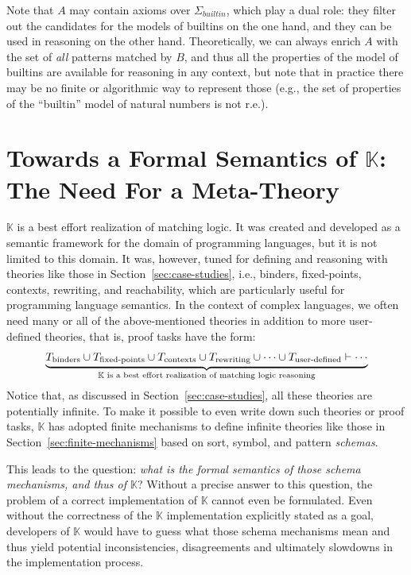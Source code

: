 \documentclass[UTF8,11pt]{article}
\theoremstyle{plain}
\theoremstyle{definition}
\theoremstyle{remark}
\newcommand{\K}{\mbox{$\mathbb{K}$}\xspace}
\newcommand{\builtin}{\textit{builtin}}
\begin{document}
Note that $A$ may contain axioms over $\Sigma_\builtin$, which play a dual
role: they filter out the candidates for the models of builtins on the one
hand, and they can be used in reasoning on the other hand.
Theoretically, we can always enrich $A$ with the set of \emph{all} patterns
matched by $B$, and thus all the properties of the model of builtins are
available for reasoning in any context, but note that in practice there may
be no finite or algorithmic way to represent those
(e.g., the set of properties of the ``builtin'' model of natural numbers is
not r.e.).

\section{Towards a Formal Semantics of {\K}: The Need For a Meta-Theory}
\label{sec:meta-theory-reflection}

{\K} is a best effort realization of matching logic.
It was created and developed as a semantic framework for the domain
of programming languages, but it is not limited to this domain.
It was, however, tuned for defining and reasoning with theories like
those in Section~\ref{sec:case-studies}, i.e.,
binders, fixed-points, contexts, rewriting, and reachability, which
are particularly useful for programming language semantics.
In the context of complex languages, we often need many or all of the
above-mentioned theories in addition to more user-defined theories, that is,
proof tasks have the form:
$$
\underbrace{T_\textrm{binders} \cup
T_\textrm{fixed-points} \cup 
T_\textrm{contexts} \cup 
T_\textrm{rewriting} \cup 
\cdots \cup 
T_\textrm{user-defined} \vdash \cdots}_
\text{\K is a best effort realization of matching logic reasoning}
$$
Notice that, as discussed in Section~\ref{sec:case-studies}, all these
theories are potentially infinite.
To make it possible to even write down such theories or proof tasks,
\K has adopted finite mechanisms to define infinite theories like those in
Section~\ref{sec:finite-mechanisms} based on sort, symbol, and
pattern \emph{schemas}.

This leads to the question:
\emph{what is the formal semantics of those schema mechanisms, and thus
of \K}?
Without a precise answer to this question, the problem of a correct
implementation of \K cannot even be formulated.
Even without the correctness of the \K implementation explicitly stated as a goal,
developers of \K would have to guess what those schema mechanisms mean and
thus yield potential inconsistencies, disagreements and ultimately slowdowns
in the implementation process.
\end{document}
